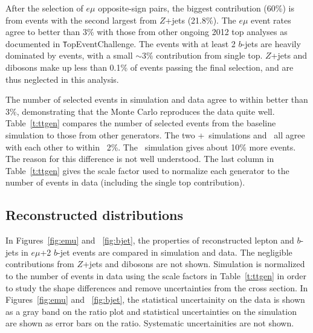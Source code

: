 After the selection of $e\mu$ opposite-sign pairs, the biggest contribution (60\%) is from \ttbar events with the second largest from $Z$+jets (21.8\%). The $e\mu$ event rates agree to  better than 3\% with those from other ongoing 2012 top analyses as documented in {\texttt TopEventChallenge}\cite{topeventchallenge}. The events with at least 2 $b$-jets are heavily dominated by \ttbar events, with a small $\sim 3\%$ contribution from single top. $Z$+jets and dibosons make up less than 0.1\% of events passing the final selection, and are thus neglected in this analysis.


The number of selected events in simulation and data agree to within better than 3\%, demonstrating that the Monte Carlo reproduces the data quite well. Table~\ref{t:ttgen} compares the number of selected events from the baseline \ttbar simulation to those from other \ttbar generators. The two \pow+\py\ simulations and \mcnlohw\ all agree with each other to within ~2\%. The \madpy\ simulation gives about 10\% more events. The reason for this difference is not well understood. The last column in Table~\ref{t:ttgen} gives the scale factor used to normalize each \ttbar generator to the number of events in data (including the single top contribution).



\subsection{Reconstructed distributions}
In Figures~\ref{fig:emu} and ~\ref{fig:bjet}, the properties of reconstructed lepton and $b$-jets in $e\mu$+2 $b$-jet events are compared in simulation and data. The negligible contributions from $Z$+jets and dibosons are not shown. Simulation is normalized to the number of events in data using the scale factors in Table~\ref{t:ttgen} in order to study the shape differences and remove uncertainties from the \ttbar cross section. In Figures~\ref{fig:emu} and ~\ref{fig:bjet}, the statistical uncertainity on the data is shown as a gray band on the ratio plot and statistical uncertainties on the simulation are shown as error bars on the ratio. Systematic uncertainities are not shown.

